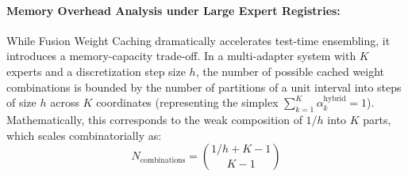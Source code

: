 \documentclass{article}
\theoremstyle{plain}
\theoremstyle{definition}
\theoremstyle{remark}
\begin{document}
\paragraph{Memory Overhead Analysis under Large Expert Registries:}
While Fusion Weight Caching dramatically accelerates test-time ensembling, it introduces a memory-capacity trade-off. In a multi-adapter system with $K$ experts and a discretization step size $h$, the number of possible cached weight combinations is bounded by the number of partitions of a unit interval into steps of size $h$ across $K$ coordinates (representing the simplex $\sum_{k=1}^K \alpha^{\text{hybrid}}_k = 1$). Mathematically, this corresponds to the weak composition of $1/h$ into $K$ parts, which scales combinatorially as:
\begin{equation}
N_{\text{combinations}} = \binom{1/h + K - 1}{K - 1}
\end{equation}
\end{document}
